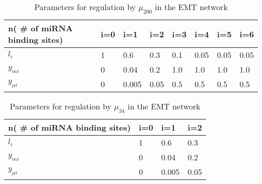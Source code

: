 \documentclass{article}
\begin{document}
\begin{table}[]
\begin{tabular}{l|lllllll}
n( \# of miRNA binding sites) & i=0 & i=1 & i=2 &i=3 & i=4 & i=5 & i=6\\
\hline
$l_i$ & 1 & 0.6 & 0.3 & 0.1 & 0.05 & 0.05 & 0.05\\
$y_{mi}$ & 0 & 0.04 & 0.2 & 1.0 & 1.0 & 1.0 & 1.0\\
$y_{\mu i} $& 0 & 0.005 & 0.05 & 0.5 & 0.5 & 0.5 & 0.5\\
\end{tabular}
\label{table:u200Params}
\caption{Parameters for regulation by $\mu_{200}$ in the EMT network}
\end{table}

\begin{table}[]
\begin{tabular}{l|lll}
n( \# of miRNA binding sites) & i=0 & i=1 & i=2 \\
\hline
$l_i$ & 1 & 0.6 & 0.3 \\
$y_{mi}$ & 0 & 0.04 & 0.2\\
$y_{\mu i} $& 0 & 0.005 & 0.05\\
\end{tabular}
\label{table:u34params}
\caption{Parameters for regulation by $\mu_{34}$ in the EMT network}
\end{table}
\end{document}
